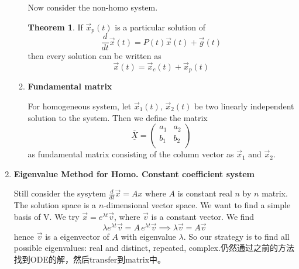 \documentclass[9pt]{article}
\theoremstyle{definition}
\newenvironment{changemargin}[2]{%
  \begin{list}{}{%
    \setlength{\topsep}{0pt}%
    \setlength{\leftmargin}{#1}%
    \setlength{\rightmargin}{#2}%
    \setlength{\listparindent}{\parindent}%
    \setlength{\itemindent}{\parindent}%
    \setlength{\parsep}{\parskip}%
  }%
  \item[]}{\end{list}}
\theoremstyle{theorem}
\newtheorem{theorem}{Theorem}
\theoremstyle{remark}
\theoremstyle{lemma}
\begin{document}
\begin{changemargin}{-0.125in}{0in}
\begin{enumerate}
\begin{enumerate}
        \bigskip
        
        Now consider the non-homo system. 
        
        \begin{theorem}
        	If $\overrightarrow{x}_p(t)$ is a particular solution of 
        	\[
        	\frac{d}{dt}\overrightarrow{x}(t) = P(t) \overrightarrow{x}(t) + \overrightarrow{g}(t)
        	\]
        	then every solution can be written as 
        	\[
        	\overrightarrow{x}(t) = \overrightarrow{x}_c(t) + \overrightarrow{x}_p(t)
        	\]
        \end{theorem}
        
        
        \medskip
        
        \item \textbf{Fundamental matrix} 
        
        \smallskip
        
        For homogeneous system, let $\overrightarrow{x}_1(t)$, $\overrightarrow{x}_2(t)$ be two linearly independent solution to the system. Then we define the matrix 
        \[
        \underline{\overline{X}} = \left(\begin{array}{cc}
     	a_1 & a_2\\
     	b_1 & b_2\\
        \end{array}\right)
        \]
        as fundamental matrix consisting of the column vector as $\overrightarrow{x}_1$ and $\overrightarrow{x}_2$.
        \end{enumerate}
        
        \medskip
        
        \item \textbf{Eigenvalue Method for Homo. Constant coefficient system}
        
        \smallskip
        
        Still consider the sysytem $\frac{d}{dt}\overrightarrow{x} = Ax$ where $A$ is constant real $n$ by $n$ matrix. The solution space is a $n$-dimensional vector space. We want to find a simple basis of V. We try $\overrightarrow{x} = e^{\lambda t}\overrightarrow{v}$, where $\overrightarrow{v}$ is a constant vector. We find
        \[
        \lambda e^{\lambda t} \overrightarrow{v}=A \,e^{\lambda t} \overrightarrow{v} \implies \lambda \overrightarrow{v} = A \overrightarrow{v}
        \]
        hence $\overrightarrow{v}$ is a eigenvector of $A$ with eigenvalue $\lambda$. So our strategy is to find all possible eigenvalues: real and distinct, repeated, complex.仍然通过之前的方法找到ODE的解，然后transfer到matrix中。
        

\end{enumerate}
\end{changemargin}
\end{document}
